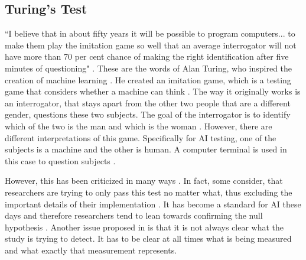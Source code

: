 \documentclass[journal]{IEEEtran}
\begin{document}
\subsection{Turing's Test} \label{turing}
``I believe that in about fifty years it will be possible to program computers... to make them play the imitation game so well that an average interrogator will not have more than 70 per cent chance of making the right identification after five minutes of questioning" \cite{alan59turing}. These are the words of Alan Turing, who inspired the creation of machine learning \cite{hayes1995turing}. He created an imitation game, which is a testing game that considers whether a machine can think \cite{alan59turing}. The way it originally works is an interrogator, that stays apart from the other two people that are a different gender, questions these two subjects. The goal of the interrogator is to identify which of the two is the man and which is the woman \cite{alan59turing}. However, there are different interpretations of this game. Specifically for AI testing, one of the subjects is a machine and the other is human. A computer terminal is used in this case to question subjects \cite{livingstone2006turing}. %

However, this has been criticized in many ways \cite{hayes1995turing}\cite{sweeney2003s}\cite{crockett1994turing}\cite{livingstone2006turing}. In fact, some consider, that researchers are trying to only pass this test no matter what, thus excluding the important details of their implementation \cite{hayes1995turing}. It has become a standard for AI these days and therefore researchers tend to lean towards confirming the null hypothesis \cite{hayes1995turing}. Another issue proposed in \cite{hayes1995turing} is that it is not always clear what the study is trying to detect. It has to be clear at all times what is being measured and what exactly that measurement represents. %
\end{document}

